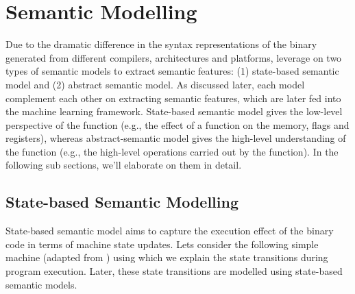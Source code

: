 \section{Semantic Modelling} \label{sec:sem_mod}

Due to the dramatic difference in the syntax representations of the binary generated from different compilers, architectures and platforms, \tool leverage on two types of semantic models
to extract semantic features: (1) state-based semantic model and (2) abstract semantic model. As discussed later, each model complement each other on extracting semantic features, which are later fed into the machine learning framework. State-based semantic model gives the low-level perspective of the function (e.g., the effect of a function on the memory, flags and registers), whereas abstract-semantic model gives the high-level understanding of the function (e.g., the high-level operations carried out by the function). In the following sub sections, we'll elaborate on them in detail.


\subsection{State-based Semantic Modelling} \label{subsec:stat_sem}
State-based semantic model aims to capture the execution effect of the binary code in terms of machine state updates. Lets consider the following simple machine (adapted from \cite{de2015micro}) using which we explain the state transitions during program execution. Later, these state transitions are modelled using state-based semantic models.

